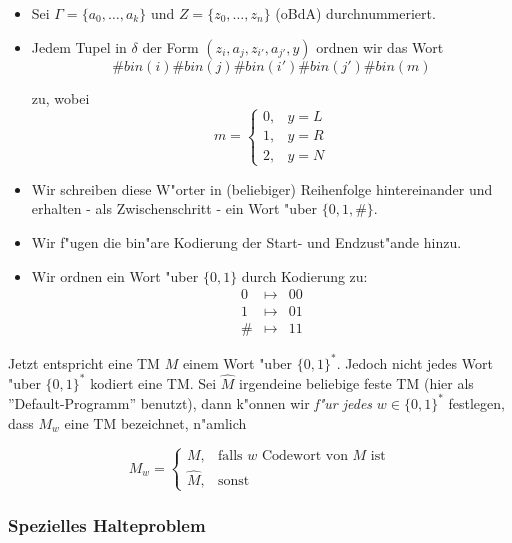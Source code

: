 \documentclass[german, 10pt, a4paper, twocolumn]{scrartcl}
\theoremstyle{definition}
\theoremstyle{example}
\begin{document}
\begin{itemize}
	\item Sei $\Gamma = \{ a_0, \ldots, a_k \}$ und $Z=\{ z_0, \ldots, z_n\}$ (oBdA) durchnummeriert.
	\item Jedem Tupel in $\delta$ der Form $(z_i,a_j,z_{i'},a_{j'},y)$ ordnen wir das Wort
		\begin{displaymath}
			\# bin(i) \# bin(j) \# bin(i') \# bin(j') \# bin(m)
		\end{displaymath}

		zu, wobei
		\begin{displaymath}
			m = \left \{
			\begin{array}{ll}
				0, &	y = L\\
				1, &	y = R\\
				2, &	y = N
			\end{array}
			\right .
		\end{displaymath}
	\item Wir schreiben diese W"orter in (beliebiger) Reihenfolge hintereinander und erhalten - als Zwischenschritt - ein Wort "uber $\{0,1,\#\}$.
	\item Wir f"ugen die bin"are Kodierung der Start- und Endzust"ande hinzu.
	\item Wir ordnen ein Wort "uber $\{0,1\}$ durch Kodierung zu:
		\begin{eqnarray*}
			0 &	\mapsto &	00\\
			1 &	\mapsto &	01\\
			\# &	\mapsto &	11
		\end{eqnarray*}
\end{itemize}

Jetzt entspricht eine TM $M$ einem Wort "uber $\{ 0,1 \}^*$. Jedoch nicht jedes Wort "uber $\{0,1\}^*$ kodiert eine TM. Sei $\hat{M}$ irgendeine beliebige feste TM (hier als ''Default-Programm'' benutzt), dann k"onnen wir \textit{f"ur jedes} $w \in \{0,1\}^*$ festlegen, dass $M_w$ eine TM bezeichnet, n"amlich

\begin{displaymath}
	M_w = \left \{
	\begin{array}{ll}
		M, &		\text{falls } w \text{ Codewort von } M \text{ ist}\\
		\hat{M}, &	\text{sonst}
	\end{array}
	\right .
\end{displaymath}

\subsubsection{Spezielles Halteproblem}
\end{document}
